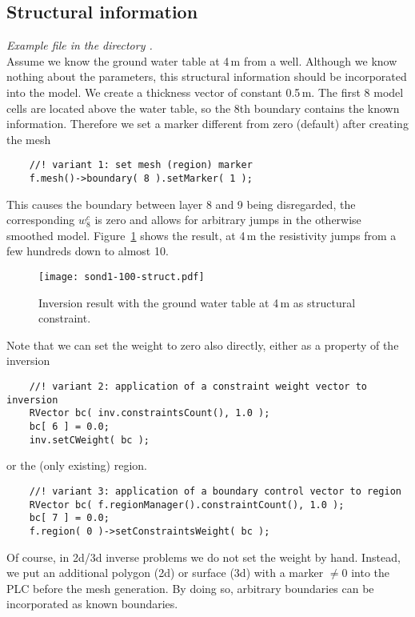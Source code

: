 \subsection{Structural information}\label{sec:dc1dstruct}
{\em Example file  in the directory .}\\
Assume we know the ground water table at 4\,m from a well.
Although we know nothing about the parameters, this structural information should be incorporated into the model.
We create a thickness vector of constant 0.5\,m. 
The first 8 model cells are located above the water table, so the 8th boundary contains the known information.
Therefore we set a marker different from zero (default) after creating the mesh
\begin{lstlisting}
    //! variant 1: set mesh (region) marker
    f.mesh()->boundary( 8 ).setMarker( 1 );
\end{lstlisting}
This causes the boundary between layer 8 and 9 being disregarded, the corresponding $w^c_8$ is zero and allows for arbitrary jumps in the otherwise smoothed model.
Figure~\ref{fig:dc1dsmooth-struct} shows the result, at 4\,m the resistivity jumps from a few hundreds down to almost 10.

\begin{figure}[htbp]
\centering\texttt{[image: sond1-100-struct.pdf]}
\caption{Inversion result with the ground water table at 4\,m as structural constraint.}\label{fig:dc1dsmooth-struct}
\end{figure}

Note that we can set the weight to zero also directly, either as a property of the inversion
\begin{lstlisting}
    //! variant 2: application of a constraint weight vector to inversion
    RVector bc( inv.constraintsCount(), 1.0 );
    bc[ 6 ] = 0.0;
    inv.setCWeight( bc ); 
\end{lstlisting}
or the (only existing) region.
\begin{lstlisting}
    //! variant 3: application of a boundary control vector to region
    RVector bc( f.regionManager().constraintCount(), 1.0 );
    bc[ 7 ] = 0.0;
    f.region( 0 )->setConstraintsWeight( bc );
\end{lstlisting}
Of course, in 2d/3d inverse problems we do not set the weight by hand.
Instead, we put an additional polygon (2d) or surface (3d) with a marker $\neq 0$ into the PLC before the mesh generation.
By doing so, arbitrary boundaries can be incorporated as known boundaries.


